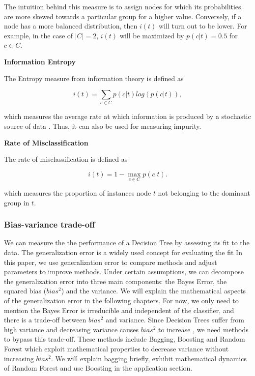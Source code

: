 The intuition behind this measure is to assign nodes 
for which its probabilities are more skewed towards a particular group for a higher value.
Conversely, if a node has a more balanced distribution, then \(i(t)\) will turn out to be lower.
For example, in the case of \( |C|=2 \), \(i(t)\) will be maximized by \( p(c|t) = 0.5 \) for \( c \in C \).


\textbf{Information Entropy}

The Entropy measure from information theory is defined as

\begin{equation}
    i(t) = \sum_{c \in C} p(c|t) log(p(c|t)),
\end{equation}

which measures the average rate at which information is produced by a stochastic source of data .
Thus, it can also be used for measuring impurity.


\textbf{Rate of Misclassification}

The rate of misclassification is defined as 

\begin{equation}
    i(t) = 1 - \max_{c \in C} p(c|t) .
\end{equation}

which measures the proportion of instances node \(t\) not belonging to the dominant group in \(t\).


\subsubsection{Bias-variance trade-off}
We can measure the the performance of a Decision Tree by assessing its fit to the data. 
The generalization error is a widely used concept for evaluating the fit \cite{breiman2001random}
In this paper, we use generalization error to compare methods and adjust parameters to improve methods. 
Under certain assumptions, we can decompose the generalization error into three main components:
the Bayes Error, the squared bias ($bias^2$) and the variance. 
We will explain the mathematical aspects of the generalization error in the following chapters. 
For now, we only need to mention the Bayes Error is irreducible and independent of the classifier, 
and there is a trade-off between $bias^2$ and variance. Since Decision Trees suffer from high variance and 
decreasing variance causes $bias^2$ to increase \cite{geman1992neural}, we need methods to bypass this trade-off. 
These methods include Bagging, Boosting and Random Forest 
which exploit mathematical properties to decrease variance without increasing $bias^2$. 
We will explain bagging briefly, exhibit mathematical dynamics of Random Forest and 
use Boosting in the application section.


